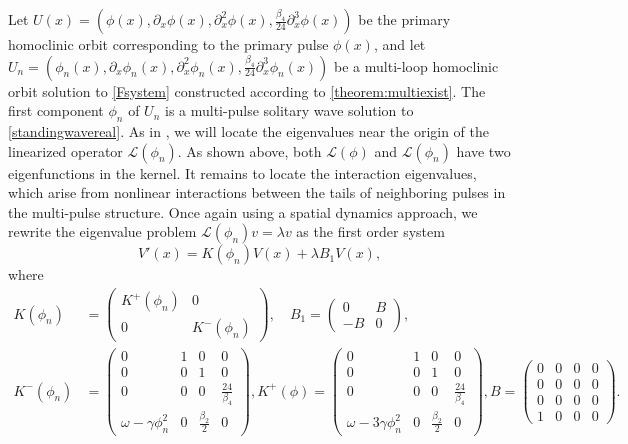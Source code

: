 \documentclass[12pt]{elsarticle}
\def\calL{{\mathcal L}}
\begin{document}
Let $U(x) = (\phi(x), \partial_x \phi(x), \partial_x^2 \phi(x), \frac{\beta_4}{24} \partial_x^3 \phi(x))$ be the primary homoclinic orbit corresponding to the primary pulse $\phi(x)$, and let $U_n = (\phi_n(x), \partial_x \phi_n(x), \partial_x^2 \phi_n(x), \frac{\beta_4}{24} \partial_x^3 \phi_n(x))$ be a multi-loop homoclinic orbit solution to \cref{Fsystem} constructed according to \cref{theorem:multiexist}. The first component $\phi_n$ of $U_n$ is a multi-pulse solitary wave solution to \cref{standingwavereal}. As in \cite{Sandstede1998,Manukian}, we will locate the eigenvalues near the origin of the linearized operator $\calL(\phi_n)$. As shown above, both $\calL(\phi)$ and $\calL(\phi_n)$ have two eigenfunctions in the kernel. It remains to locate the interaction eigenvalues, which arise from nonlinear interactions between the tails of neighboring pulses in the multi-pulse structure. Once again using a spatial dynamics approach, we rewrite the eigenvalue problem $\calL(\phi_n)v = \lambda v$ as the first order system
\begin{equation}\label{multieig}
V'(x) = K(\phi_n)V(x) + \lambda B_1 V(x),
\end{equation}
where
\begin{align*}
K(\phi_n) &= 
\begin{pmatrix}K^+(\phi_n) & 0 \\ 0 & K^-(\phi_n) \end{pmatrix}, \quad
B_1 = \begin{pmatrix}0 & B \\ -B & 0\end{pmatrix}, \\
K^-(\phi_n) &= \begin{pmatrix}
0 & 1 & 0 & 0 \\
0 & 0 & 1 & 0 \\
0 & 0 & 0 & \frac{24}{\beta_4} \\
\omega - \gamma \phi_n^2 & 0 & \frac{\beta_2}{2} & 0
\end{pmatrix},
K^+(\phi) = \begin{pmatrix}
0 & 1 & 0 & 0 \\
0 & 0 & 1 & 0 \\
0 & 0 & 0 & \frac{24}{\beta_4} \\
\omega - 3 \gamma \phi_n^2 & 0 & \frac{\beta_2}{2} & 0
\end{pmatrix},
B = \begin{pmatrix}
0 & 0 & 0 & 0 \\
0 & 0 & 0 & 0 \\
0 & 0 & 0 & 0 \\
1 & 0 & 0 & 0
\end{pmatrix}.
\end{align*}
\end{document}
